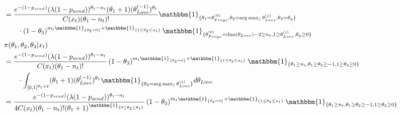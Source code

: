 \documentclass[10pt, a4paper]{article}
\begin{document}
\begin{align*}
        &= \frac{e^{-(1-p_{send})}(\lambda(1-p_{send}))^{\theta_1-n_t}(\theta_1+1)(\theta_{Love}^{(-1)})^{\theta_1}}{C(x_t)(\theta_1-n_t)!}\mathbbm{1}_{\{\theta_1=\theta_{Frogs}^{(0)}, \theta_2=\arg\max_j\theta_{Love}^{(j)}, \theta_3=\theta_p\}}\\&\qquad\cdot\left(1-\theta_3\right)^{m_t\mathbbm{1}_{\{\theta_2=0\}}+\mathbbm{1}_{\{1 \leq \theta_2 \leq n_t\}}}\mathbbm{1}_{\{\theta_{Frogs}^{(0)} = \dim(\theta_{Love})-2 \geq n_t, 1 \geq \theta_{Love}^{(i)},\theta_p\geq 0\}} \\ 
        &\pi(\theta_1, \theta_2, \theta_3|x_t) \\
        &= \frac{e^{-(1-p_{send})}(\lambda(1-p_{send}))^{\theta_1-n_t}}{C(x_t)(\theta_1-n_t)!}\left(1-\theta_3\right)^{m_t\mathbbm{1}_{\{\theta_2=0\}}+\mathbbm{1}_{\{1 \leq \theta_2 \leq n_t\}}}\mathbbm{1}_{\{\theta_1\geq n_t, \theta_1 \geq \theta_2 \geq -1, 1 \geq \theta_3 \geq 0\}} \\&\qquad\cdot \int_{[0,1]^{\theta_1+2}} (\theta_1+1)(\theta_{Love}^{(-1)})^{\theta_1}\mathbbm{1}_{\{\theta_2=\arg\max_j\theta_{Love}^{(j)}\}} d\theta_{Love} \\ 
        &= \frac{e^{-(1-p_{send})}(\lambda(1-p_{send}))^{\theta_1-n_t}}{4C(x_t)(\theta_1-n_t)!(\theta_1+1)^{\mathbbm{1}_{\{0\leq\theta_2\leq \theta_1\}}}}\left(1-\theta_3\right)^{m_t\mathbbm{1}_{\{\theta_2=0\}}+\mathbbm{1}_{\{1 \leq \theta_2 \leq n_t\}}}\mathbbm{1}_{\{\theta_1\geq n_t, \theta_1 \geq \theta_2 \geq -1, 1 \geq \theta_3 \geq 0\}} 
    \end{align*}
\end{document}
